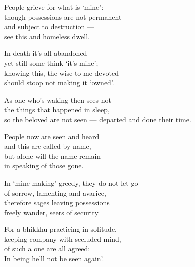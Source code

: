 \begin{MyDescription}{}
People grieve for what is `mine':\\
though possessions are not permanent\\
and subject to destruction —\\
see this and homeless dwell.
\end{MyDescription}

\begin{MyDescription}{}
In death it's all abandoned\\
yet still some think `it's mine';\\
knowing this, the wise to me devoted\\
should stoop not making it `owned'.
\end{MyDescription}

\begin{MyDescription}{}
As one who's waking then sees not\\
the things that happened in sleep,\\
so the beloved are not seen —
departed and done their time.
\end{MyDescription}

\begin{MyDescription}{}
People now are seen and heard\\
and this are called by name,\\
but alone will the name remain\\
in speaking of those gone.
\end{MyDescription}

\begin{MyDescription}{}
In `mine-making' greedy, they do not let go\\
of sorrow, lamenting and avarice,\\
therefore sages leaving possessions\\
freely wander, seers of security
\end{MyDescription}

\begin{MyDescription}{}
For a bhikkhu practicing in solitude,\\
keeping company with secluded mind,\\
of such a one are all agreed:\\
In being he'll not be seen again'.
\end{MyDescription}

